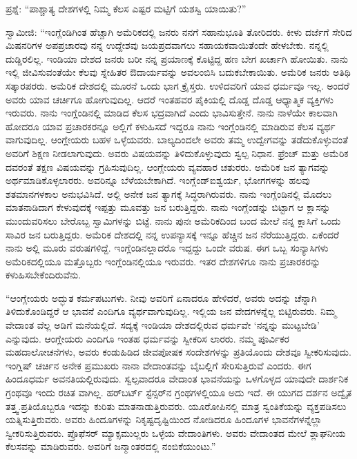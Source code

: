 ಪ್ರಶ್ನೆ: “ಪಾಶ್ಚಾತ್ಯ ದೇಶಗಳಲ್ಲಿ ನಿಮ್ಮ ಕೆಲಸ ಎಷ್ಟರ ಮಟ್ಟಿಗೆ ಯಶಸ್ವಿ ಯಾಯಿತು?”

ಸ್ವಾಮೀಜಿ: “ಇಂಗ್ಲೆಂಡಿಗಿಂತ ಹೆಚ್ಚಾಗಿ ಅಮೆರಿಕದಲ್ಲಿ ಜನರು ನನಗೆ ಸಹಾನುಭೂತಿ ತೋರಿದರು. ಕೀಳು ದರ್ಜೆಗೆ ಸೇರಿದ ಮಿಷನರಿಗಳ ಅಪಪ್ರಚಾರವು ನನ್ನ ಉದ್ದೇಶವು ಜಯಪ್ರದವಾಗಲು ಸಹಾಯಕವಾಯಿತೆಂದೇ ಹೇಳಬೇಕು. ನನ್ನಲ್ಲಿ ದುಡ್ಡಿರಲಿಲ್ಲ. ಇಂಡಿಯಾ ದೇಶದ ಜನರು ಬರೀ ನನ್ನ ಪ್ರಯಾಣಕ್ಕೆ ಕೊಟ್ಟಿದ್ದ ಹಣ ಬೇಗ ಖರ್ಚಾಗಿ ಹೋಯಿತು. ನಾನು ಇಲ್ಲಿ ಜೀವಿಸುವಂತೆಯೇ ಕೆಲವು ಸ್ನೇಹಿತರ ಔದಾರ್ಯವನ್ನು ಅವಲಂಬಿಸಿ ಬದುಕಬೇಕಾಯಿತು. ಅಮೆರಿಕ ಜನರು ಅತಿಥಿ ಸತ್ಕಾರಪರರು. ಅಮೆರಿಕ ದೇಶದಲ್ಲಿ ಮೂರನೆ ಒಂದು ಭಾಗ ಕ್ರೈಸ್ತರು. ಉಳಿದವರಿಗೆ ಯಾವ ಧರ್ಮವೂ ಇಲ್ಲ. ಅಂದರೆ ಅವರು ಯಾವ ಚರ್ಚಿಗೂ ಹೋಗುವುದಿಲ್ಲ. ಆದರೆ ಇಂತಹವರ ಪೈಕಿಯಲ್ಲಿ ದೊಡ್ಡ ದೊಡ್ಡ ಆಧ್ಯಾತ್ಮಿಕ ವ್ಯಕ್ತಿಗಳು ಇರುವರು. ನಾನು ಇಂಗ್ಲೆಂಡಿನಲ್ಲಿ ಮಾಡಿದ ಕೆಲಸ ಭದ್ರವಾಗಿದೆ ಎಂದು ಭಾವಿಸುತ್ತೇನೆ. ನಾನು ನಾಳೆಯೇ ಕಾಲವಾಗಿ ಹೋದರೂ ಯಾವ ಪ್ರಚಾರಕರನ್ನೂ ಅಲ್ಲಿಗೆ ಕಳುಹಿಸದೆ ಇದ್ದರೂ ನಾನು ಇಂಗ್ಲೆಂಡಿನಲ್ಲಿ ಮಾಡಿರುವ ಕೆಲಸ ವ್ಯರ್ಥ ವಾಗುವುದಿಲ್ಲ. ಆಂಗ್ಲೇಯರು ಬಹಳ ಒಳ್ಳೆಯವರು. ಬಾಲ್ಯದಿಂದಲೇ ಅವರು ತಮ್ಮ ಉದ್ವೇಗವನ್ನು ತಡೆದುಕೊಳ್ಳುವಂತೆ ಅವರಿಗೆ ಶಿಕ್ಷಣ ನೀಡಲಾಗುವುದು. ಅವರು ವಿಷಯವನ್ನು ತಿಳಿದುಕೊಳ್ಳುವುದು ಸ್ವಲ್ಪ ನಿಧಾನ. ಫ್ರೆಂಚ್​ ಮತ್ತು ಅಮೆರಿಕ ದವರಂತೆ ತಕ್ಷಣ ವಿಷಯವನ್ನು ಗ್ರಹಿಸುವುದಿಲ್ಲ. ಆಂಗ್ಲೇಯರು ವ್ಯವಹಾರ ಚತುರರು. ಅಮೆರಿಕ ಜನ ತ್ಯಾಗವನ್ನು ಅರ್ಥಮಾಡಿಕೊಳ್ಳಲಾರರು. ಅವರಿನ್ನೂ ಬೆಳೆಯಬೇಕಾಗಿದೆ. ಇಂಗ್ಲೆಂಡ್​ ಐಶ್ವರ್ಯ, ಭೋಗಗಳನ್ನು ಹಲವು ಶತಮಾನಗಳಕಾಲ ಅನುಭವಿಸಿದೆ. ಅಲ್ಲಿ ಅನೇಕ ಜನ ತ್ಯಾಗಕ್ಕೆ ಸಿದ್ಧರಾಗಿರುವರು. ನಾನು ಇಂಗ್ಲೆಂಡಿನಲ್ಲಿ ಮೊದಲು ಮಾತನಾಡಿದಾಗ ಕೇಳುವುದಕ್ಕೆ ಇಪ್ಪತ್ತು ಮೂವತ್ತು ಜನ ಬರುತ್ತಿದ್ದರು. ನಾನು ಇಂಗ್ಲೆಂಡನ್ನು ಬಿಟ್ಟಾಗ ಆ ಕ್ಲಾಸನ್ನು ಮುಂದುವರಿಸಲು ಬೇರೊಬ್ಬ ಸ್ವಾಮಿಗಳನ್ನು ಬಿಟ್ಟೆ. ನಾನು ಪುನಃ ಅಮೆರಿಕದಿಂದ ಬಂದ ಮೇಲೆ ನನ್ನ ಕ್ಲಾಸಿಗೆ ಒಂದು ಸಾವಿರ ಜನ ಬರುತ್ತಿದ್ದರು. ಅಮೆರಿಕ ದೇಶದಲ್ಲಿ ನನ್ನ ಉಪನ್ಯಾಸಕ್ಕೆ ಇನ್ನೂ ಹೆಚ್ಚಿನ ಜನ ನೆರೆಯುತ್ತಿದ್ದರು. ಏಕೆಂದರೆ ನಾನು ಅಲ್ಲಿ ಮೂರು ವರುಷಗಳಿದ್ದೆ. ಇಂಗ್ಲೆಂಡಿನಲ್ಲಾದರೊ ಇದ್ದದ್ದು ಒಂದೇ ವರುಷ. ಈಗ ಒಬ್ಬ ಸಂನ್ಯಾಸಿಗಳು ಅಮೆರಿಕದಲ್ಲಿಯೂ ಮತ್ತೊಬ್ಬರು ಇಂಗ್ಲೆಂಡಿನಲ್ಲಿಯೂ ಇರುವರು. ಇತರ ದೇಶಗಳಿಗೂ ನಾನು ಪ್ರಚಾರಕರನ್ನು ಕಳುಹಿಸಬೇಕೆಂದಿರುವೆನು.

“ಆಂಗ್ಲೇಯರು ಅದ್ಭುತ ಕರ್ಮಪಟುಗಳು. ನೀವು ಅವರಿಗೆ ಏನಾದರೂ ಹೇಳಿದರೆ, ಅವರು ಅದನ್ನು ಚೆನ್ನಾಗಿ ತಿಳಿದುಕೊಂಡಿದ್ದರೆ ಆ ಭಾವನೆ ಎಂದಿಗೂ ವ್ಯರ್ಥವಾಗುವುದಿಲ್ಲ. ಇಲ್ಲಿಯ ಜನ ವೇದಗಳನ್ನೆಲ್ಲ ಬಿಟ್ಟಿರುವರು. ನಿಮ್ಮ ವೇದಾಂತ ವೆಲ್ಲ ಅಡಿಗೆ ಮನೆಯಲ್ಲಿದೆ. ಸದ್ಯಕ್ಕೆ ಇಂಡಿಯಾ ದೇಶದಲ್ಲಿರುವ ಧರ್ಮವೇ ‘ನನ್ನನ್ನು ಮುಟ್ಟಬೇಡಿ’ ಎನ್ನುವುದು. ಆಂಗ್ಲೇಯರು ಎಂದಿಗೂ ಇಂತಹ ಧರ್ಮವನ್ನು ಸ್ವೀಕರಿಸ ಲಾರರು. ನಮ್ಮ ಪೂರ್ವಿಕರ ಮಹದಾಲೋಚನೆಗಳು, ಅವರು ಕಂಡುಹಿಡಿದ ಜೀವಪೋಷಕ ಸಂದೇಶಗಳನ್ನು ಪ್ರತಿಯೊಂದು ದೇಶವೂ ಸ್ವೀಕರಿಸುವುದು. ಇಂಗ್ಲಿಷ್​ ಚರ್ಚಿನ ಅನೇಕ ಪ್ರಮುಖರು ನಾನಾ ವೇದಾಂತವನ್ನು ಬೈಬಲ್ಲಿಗೆ ಸೇರಿಸುತ್ತಿರುವೆ ಎಂದರು. ಈಗ ಹಿಂದೂಧರ್ಮ ಅವನತಿಯಲ್ಲಿರುವುದು. ಸ್ವಲ್ಪವಾದರೂ ವೇದಾಂತ ಭಾವನೆಯನ್ನು ಒಳಗೊಳ್ಳದ ಯಾವುದೇ ದಾರ್ಶನಿಕ ಗ್ರಂಥವೂ ಇಂದು ರಚಿತ ವಾಗಿಲ್ಲ. ಹರ್​ಬರ್ಟ್​ ಸ್ಟೆನ್ಸರ್​ನ ಗ್ರಂಥಗಳಲ್ಲಿಯೂ ಅದು ಇದೆ. ಈ ಯುಗದ ದರ್ಶನ ಅದ್ವೈತ ತತ್ತ್ವ.ಪ್ರತಿಯೊಬ್ಬರೂ ಇದನ್ನು ಕುರಿತು ಮಾತನಾಡುತ್ತಿರುವರು. ಯೂರೋಪಿನಲ್ಲಿ ಮಾತ್ರ ಸ್ವಂತಿಕೆಯನ್ನು ವ್ಯಕ್ತಪಡಿಸಲು ಯತ್ನಿಸುತ್ತಿರುವರು. ಅವರು ಹಿಂದೂಗಳನ್ನು ನಿಕೃಷ್ಟದೃಷ್ಟಿಯಿಂದ ನೋಡಿದರೂ ಹಿಂದೂಗಳ ಭಾವನೆಗಳನ್ನೆಲ್ಲಾ ಸ್ವೀಕರಿಸುತ್ತಿರುವರು. ಪ್ರೊಫೆಸರ್​ ಮ್ಯಾಕ್ಸಮುಲ್ಲರು ಒಳ್ಳೆಯ ವೇದಾಂತಿಗಳು. ಅವರು ವೇದಾಂತದ ಮೇಲೆ ಶ್ಲಾಘನೀಯ ಕೆಲಸವನ್ನು ಮಾಡಿರುವರು. ಅವರಿಗೆ ಜನ್ಮಾಂತರದಲ್ಲಿ ನಂಬಿಕೆಯುಂಟು.”

